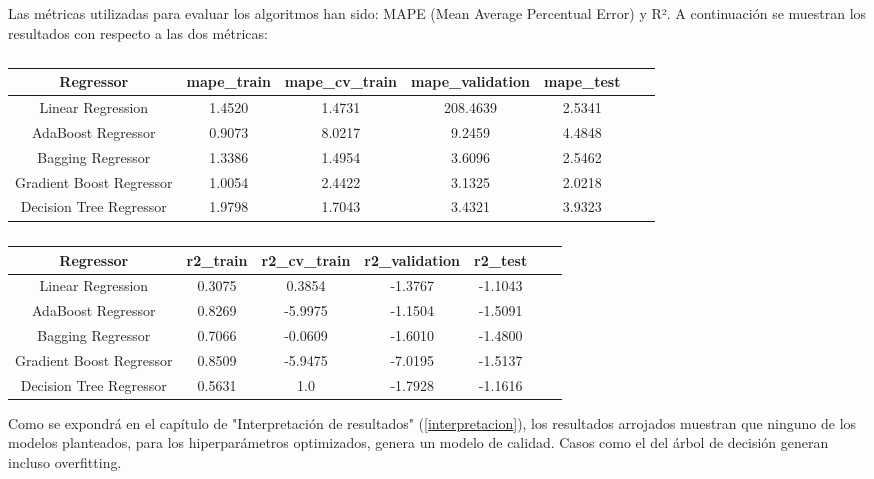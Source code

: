 \documentclass[12pt]{article}
\begin{document}
	Las métricas utilizadas para evaluar los algoritmos han sido: MAPE (Mean Average Percentual Error) y R². A continuación se muestran los resultados con respecto a las dos métricas:
	
	\begingroup
	\begin{table}[H]
	\caption{\label{tabla}}
		\centering
		\setlength{\tabcolsep}{3pt}
		\renewcommand{\arraystretch}{1.5}
		\begin{tabular}{|c|c|c|c|c|c|c|}
			\hline
			Regressor & mape\_train & mape\_cv\_train & mape\_validation & mape\_test \\
			\hline
			Linear Regression & 1.4520 & 1.4731 & 208.4639 & 2.5341 \\
			AdaBoost Regressor & 0.9073 & 8.0217 & 9.2459 & 4.4848 \\
			Bagging Regressor & 1.3386 & 1.4954 & 3.6096 & 2.5462 \\
			Gradient Boost Regressor & 1.0054 & 2.4422 & 3.1325 & 2.0218 \\
			Decision Tree Regressor & 1.9798 & 1.7043 & 3.4321 & 3.9323 \\
			\hline
		\end{tabular}
	\end{table}
	\endgroup
	
	\begingroup
	\begin{table}[H]
		\caption{\label{tabla}}
		\centering
		\setlength{\tabcolsep}{3pt}
		\renewcommand{\arraystretch}{1.5}
		\begin{tabular}{|c|c|c|c|c|c|c|}
			\hline
			Regressor & r2\_train & r2\_cv\_train & r2\_validation & r2\_test \\
			\hline
			Linear Regression & 0.3075 & 0.3854 & -1.3767 & -1.1043 \\
			AdaBoost Regressor & 0.8269 & -5.9975 & -1.1504 & -1.5091 \\
			Bagging Regressor & 0.7066 & -0.0609 & -1.6010 & -1.4800 \\
			Gradient Boost Regressor & 0.8509 & -5.9475 & -7.0195 & -1.5137 \\
			Decision Tree Regressor & 0.5631 & 1.0 & -1.7928 & -1.1616 \\
			\hline
		\end{tabular}
	\end{table}
	\endgroup
	
	Como se expondrá en el capítulo de "Interpretación de resultados" (\ref{interpretacion}), los resultados arrojados muestran que ninguno de los modelos planteados, para los hiperparámetros optimizados, genera un modelo de calidad. Casos como el del árbol de decisión generan incluso overfitting.
\end{document}
